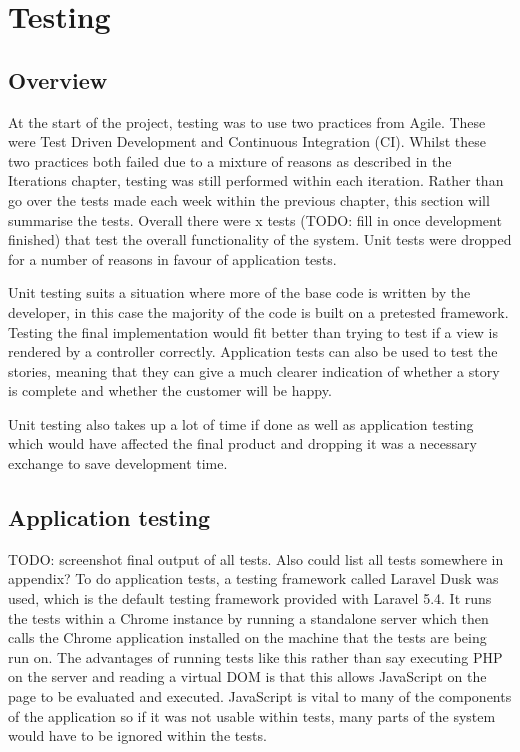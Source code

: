 \chapter{Testing}

\section{Overview}
At the start of the project, testing was to use two practices from Agile. These were Test Driven Development and Continuous Integration (CI). Whilst these two practices both failed due to a mixture of reasons as described in the Iterations chapter, testing was still performed within each iteration. Rather than go over the tests made each week within the previous chapter, this section will summarise the tests. Overall there were x tests (TODO: fill in once development finished) that test the overall functionality of the system. Unit tests were dropped for a number of reasons in favour of application tests.

Unit testing suits a situation where more of the base code is written by the developer, in this case the majority of the code is built on a pretested framework. Testing the final implementation would fit better than trying to test if a view is rendered by a controller correctly. Application tests can also be used to test the stories, meaning that they can give a much clearer indication of whether a story is complete and whether the customer will be happy.

Unit testing also takes up a lot of time if done as well as application testing which would have affected the final product and dropping it was a necessary exchange to save development time.

\section{Application testing}
TODO: screenshot final output of all tests. Also could list all tests somewhere in appendix?
To do application tests, a testing framework called Laravel Dusk was used, which is the default testing framework provided with Laravel 5.4\cite{dusk}\cite{dusk-desc}. It runs the tests within a Chrome instance by running a standalone server which then calls the Chrome application installed on the machine that the tests are being run on. The advantages of running tests like this rather than say executing PHP on the server and reading a virtual DOM is that this allows JavaScript on the page to be evaluated and executed. JavaScript is vital to many of the components of the application so if it was not usable within tests, many parts of the system would have to be ignored within the tests.

